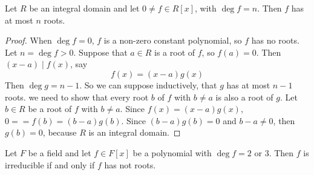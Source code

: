 \begin{thm}
Let $R$ be an integral domain and let $0 \neq f \in R[x]$, with $\deg f = n$. Then $f$ has at most $n$ roots.
\end{thm}

\begin{proof}
When $\deg f = 0$, $f$ is a non-zero constant polynomial, so $f$ has no roots. Let $n = \deg f > 0$. Suppose that $a\in R$ is a root of $f$, so $f(a) = 0$. Then $(x-a)\mid f(x)$, say \[f(x) = (x-a)g(x)\] Then $\deg g = n-1$. So we can suppose inductively, that $g$ has at most $n-1$ roots. we need to show that every root $b$ of $f$ with $b\neq a$ is also a root of $g$. Let $b\in R$ be a root of $f$ with $b\neq a$. Since $f(x) = (x-a)g(x)$, $0= = f(b) = (b-a)g(b)$. Since $(b-a)g(b) =0$ and $b-a \neq 0$, then $g(b) = 0$, because $R$ is an integral domain.
\end{proof}

\begin{thm}[]
Let $F$ be a field and let $f\in F[x]$ be a polynomial with $\deg f = 2 \text{ or } 3$. Then $f$ is irreducible if and only if $f$ has not roots.
\end{thm}
